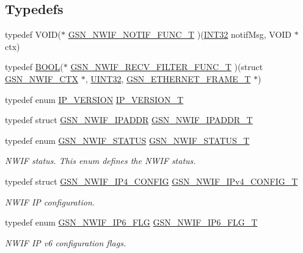 \subsection*{Typedefs}
\begin{DoxyCompactItemize}
\item 
typedef VOID($\ast$ \hyperlink{a00534_a58445849a3e6cfa33fbc058bafdb717c}{GSN\_\-NWIF\_\-NOTIF\_\-FUNC\_\-T} )(\hyperlink{a00660_ga63021d67d54286c2163bcdb43a6f2569}{INT32} notifMsg, VOID $\ast$ctx)
\item 
typedef \hyperlink{a00660_ga1f04022c0a182c51c059438790ea138c}{BOOL}($\ast$ \hyperlink{a00534_a2ab3fab7c51c5e11d061387dd44a2381}{GSN\_\-NWIF\_\-RECV\_\-FILTER\_\-FUNC\_\-T} )(struct \hyperlink{a00167}{GSN\_\-NWIF\_\-CTX} $\ast$, \hyperlink{a00660_gae1e6edbbc26d6fbc71a90190d0266018}{UINT32}, \hyperlink{a00068}{GSN\_\-ETHERNET\_\-FRAME\_\-T} $\ast$)
\item 
typedef enum \hyperlink{a00534_abf9adb0cafd6914964a2ccab114e4bfe}{IP\_\-VERSION} \hyperlink{a00534_af2db652f956f3af146d479868ef42d8f}{IP\_\-VERSION\_\-T}
\item 
typedef struct \hyperlink{a00173}{GSN\_\-NWIF\_\-IPADDR} \hyperlink{a00534_afc14e738a321ca724b331f740ee59e14}{GSN\_\-NWIF\_\-IPADDR\_\-T}
\item 
typedef enum \hyperlink{a00670_ga6831d8e94870e58c8ba6de3fd14e829d}{GSN\_\-NWIF\_\-STATUS} \hyperlink{a00670_ga31b009654c9ee4d7037151b19f1f213a}{GSN\_\-NWIF\_\-STATUS\_\-T}
\begin{DoxyCompactList}\small\item\em NWIF status. This enum defines the NWIF status. \end{DoxyCompactList}\item 
typedef struct \hyperlink{a00170}{GSN\_\-NWIF\_\-IP4\_\-CONFIG} \hyperlink{a00670_ga30485b44668b2a98ecdc5571f9a6fed5}{GSN\_\-NWIF\_\-IPv4\_\-CONFIG\_\-T}
\begin{DoxyCompactList}\small\item\em NWIF IP configuration. \end{DoxyCompactList}\item 
typedef enum \hyperlink{a00670_ga283a80240d803667a00eb79d19d53fd6}{GSN\_\-NWIF\_\-IP6\_\-FLG} \hyperlink{a00670_gaeae6a78e867541f488c5b1db9f7508f7}{GSN\_\-NWIF\_\-IP6\_\-FLG\_\-T}
\begin{DoxyCompactList}\small\item\em NWIF IP v6 configuration flags. \end{DoxyCompactList}\item 

\end{DoxyCompactItemize}
